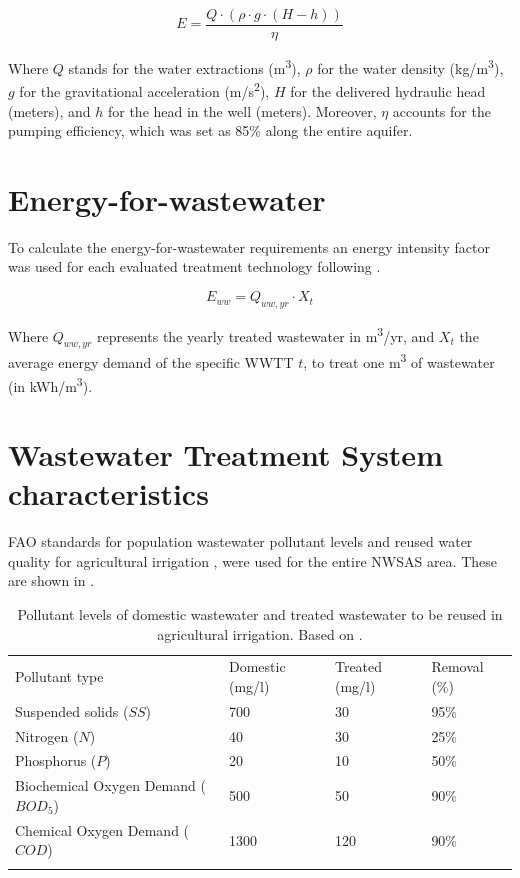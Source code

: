 \documentclass[12pt]{iopart}
\begin{document}
\begin{equation}\label{eq:1}
E = \frac{Q\cdot(\rho\cdot g\cdot(H - h))}{\eta}
\end{equation}

Where $Q$ stands for the water extractions (m\textsuperscript{3}), $\rho$ for the water density (kg/m\textsuperscript{3}), $g$ for the gravitational acceleration (m/s\textsuperscript{2}), $H$ for the delivered hydraulic head (meters), and $h$ for the head in the well (meters). Moreover, $\eta$ accounts for the pumping efficiency, which was set as 85\% along the entire aquifer.

\section{Energy-for-wastewater}\label{Sc:eww}
To calculate the energy-for-wastewater requirements an energy intensity factor was used for each evaluated treatment technology following .

\begin{equation}\label{eq:energy-for-wastewater}
E_{ww} = Q_{ww,yr}\cdot X_t
\end{equation}

Where $Q_{ww,yr}$ represents the yearly treated wastewater in m\textsuperscript{3}/yr, and $X_t$ the average energy demand of the specific WWTT $t$, to treat one m\textsuperscript{3} of wastewater (in kWh/m\textsuperscript{3}).

\section{Wastewater Treatment System characteristics}
FAO standards for population wastewater pollutant levels and reused water quality for agricultural irrigation \cite{fao1985water}, were used for the entire NWSAS area. These are shown in .

\begin{table}[!ht]
	\caption{\label{tbl:pollutans}Pollutant levels of domestic wastewater and treated wastewater to be reused in agricultural irrigation. Based on \cite{fao1985water}.}
	\footnotesize
		\begin{tabular}{@{}*{4}l}
			\br
			Pollutant type & Domestic (mg/l) & Treated (mg/l) & Removal (\%)\\
			\mr
			Suspended solids ($SS$) & 700 & 30 & 95\%\\
			Nitrogen ($N$) & 40 & 30 & 25\%\\
			Phosphorus ($P$) & 20 & 10 & 50\%\\
			Biochemical Oxygen Demand ($BOD_5$) & 500 & 50 & 90\%\\
			Chemical Oxygen Demand ($COD$)& 1300 & 120 & 90\%\\
			\br
		\end{tabular}
\end{table}
\end{document}
